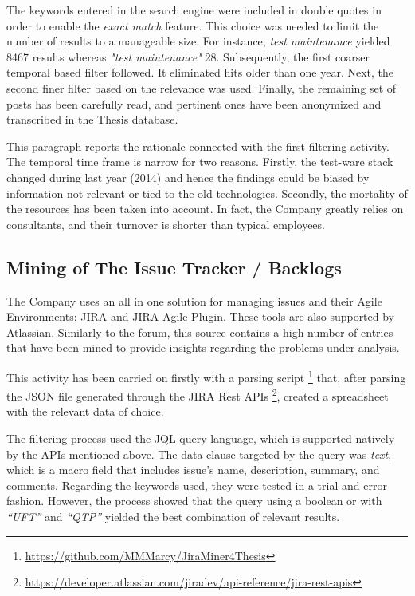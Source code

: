 The keywords entered in the search engine were included in double quotes in order to enable the \textit{exact match} feature. This choice was needed to limit the number of results to a manageable size. For instance, \textit{test maintenance} yielded 8467 results whereas \textit{"test maintenance"} 28. Subsequently, the first coarser temporal based filter followed. It eliminated hits older than one year. Next, the second finer filter based on the relevance was used. Finally, the remaining set of posts has been carefully read, and pertinent ones have been anonymized and transcribed in the Thesis database.

This paragraph reports the rationale connected with the first filtering activity. The temporal time frame is narrow for two reasons. Firstly, the test-ware stack changed during last year (2014) and hence the findings could be biased by information not relevant or tied to the old technologies. Secondly, the mortality of the resources has been taken into account. In fact, the Company greatly relies on consultants, and their turnover is shorter than typical employees.

\subsection{Mining of The Issue Tracker / Backlogs} \label{mining_issue_tracker}
The Company uses an all in one solution for managing issues and their Agile Environments: JIRA and JIRA Agile Plugin. These tools are also supported by Atlassian. Similarly to the forum, this source contains a high number of entries that have been mined to provide insights regarding the problems under analysis.

This activity has been carried on firstly with a parsing script \footnote{\href{https://github.com/MMMarcy/JiraMiner4Thesis}{https://github.com/MMMarcy/JiraMiner4Thesis}} that, after parsing the JSON file generated through the JIRA Rest APIs \footnote{\href{https://developer.atlassian.com/jiradev/api-reference/jira-rest-apis}{https://developer.atlassian.com/jiradev/api-reference/jira-rest-apis}}, created a spreadsheet with the relevant data of choice.


The filtering process used the JQL query language, which is supported natively by the APIs mentioned above. The data clause targeted by the query was \textit{text}, which is a macro field that includes issue's name, description, summary, and comments. Regarding the keywords used, they were tested in a trial  and error fashion. However, the process showed that the query using a boolean or with \textit{``UFT''} and \textit{``QTP''} yielded the best combination of relevant results.

